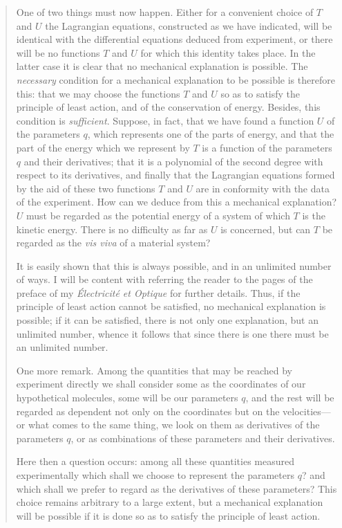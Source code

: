 \begin{quote}
    One of two things must now happen.  Either for a convenient choice of $T$ and $U$ the Lagrangian equations, constructed as we have indicated, will be identical with the differential equations deduced from experiment, or there will be no functions $T$ and $U$ for which this identity takes place.  In the latter case it is clear that no mechanical explanation is possible.  The \emph{necessary} condition for a mechanical explanation to be possible is therefore this: that we may choose the functions $T$ and $U$ so as to satisfy the principle of least action, and of the conservation of energy.  Besides, this condition is \emph{sufficient}.  Suppose, in fact, that we have found a function $U$ of the parameters $q$, which represents one of the parts of energy, and that the part of the energy which we represent by $T$ is a function of the parameters $q$ and their derivatives; that it is a polynomial of the second degree with respect to its derivatives, and finally that the Lagrangian equations formed by the aid of these two functions $T$ and $U$ are in conformity with the data of the experiment.  How can we deduce from this a mechanical explanation?  $U$ must be regarded as the potential energy of a system of which $T$ is the kinetic energy.  There is no difficulty as far as $U$ is concerned, but can $T$ be regarded as the \emph{vis viva} of a material system?
    
    It is easily shown that this is always possible, and in an unlimited number of ways.  I will be content with referring the reader to the pages of the preface of my \emph{\'Electricit\'e et Optique} for further details.  Thus, if the principle of least action cannot be satisfied, no mechanical explanation is possible; if it can be satisfied, there is not only one explanation, but an unlimited number, whence it follows that since there is one there must be an unlimited number.
    
    One more remark.  Among the quantities that may be reached by experiment directly we shall consider some as the coordinates of our hypothetical molecules, some will be our parameters $q$, and the rest will be regarded as dependent not only on the coordinates but on the velocities---or what comes to the same thing, we look on them as derivatives of the parameters $q$, or as combinations of these parameters and their derivatives.
    
    Here then a question occurs: among all these quantities measured experimentally which shall we choose to represent the parameters $q$? and which shall we prefer to regard as the derivatives of these parameters?  This choice remains arbitrary to a large extent, but a mechanical explanation will be possible if it is done so as to satisfy the principle of least action.
    

\end{quote}
